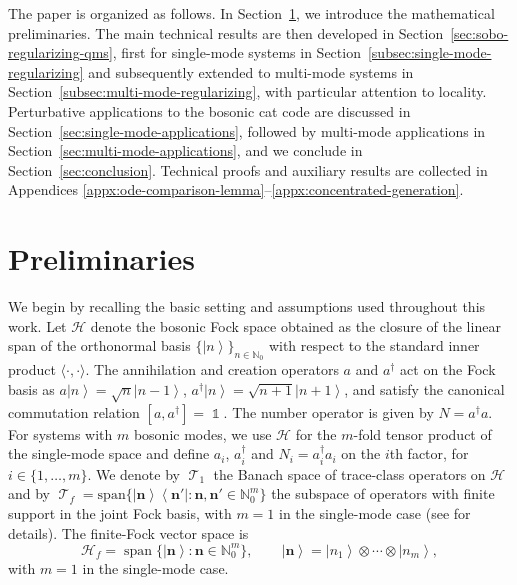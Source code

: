 \documentclass[11pt]{article}
\theoremstyle{myplain}
\theoremstyle{mydefinition}
\theoremstyle{remark}
\DeclareMathOperator{\cT}{\mathcal{T}}
\DeclareMathOperator{\1}{\mathds{1}}
\newcommand{\ketbra}[2]{\left\vert#1\right\rangle\!\! \left\langle#2\right\vert}
\newcommand{\ket}[1]{\left\vert #1 \right\rangle}
\begin{document}
    The paper is organized as follows. In Section~\ref{sec:prelim}, we introduce the mathematical preliminaries. The main technical results are then developed in Section~\ref{sec:sobo-regularizing-qms}, first for single-mode systems in Section~\ref{subsec:single-mode-regularizing} and subsequently extended to multi-mode systems in Section~\ref{subsec:multi-mode-regularizing}, with particular attention to locality. Perturbative applications to the bosonic cat code are discussed in Section~\ref{sec:single-mode-applications}, followed by multi-mode applications in Section~\ref{sec:multi-mode-applications}, and we conclude in Section~\ref{sec:conclusion}. Technical proofs and auxiliary results are collected in Appendices \ref{appx:ode-comparison-lemma}--\ref{appx:concentrated-generation}.
    


\section{Preliminaries}\label{sec:prelim}
    We begin by recalling the basic setting and assumptions used throughout this work. Let $\mathcal{H}$ denote the bosonic Fock space obtained as the closure of the linear span of the orthonormal basis $\{\ket{n}\}_{n \in \mathbb{N}_0}$ with respect to the standard inner product $\langle \cdot, \cdot \rangle$. The annihilation and creation operators $a$ and $a^\dagger$ act on the Fock basis as $a\ket{n} = \sqrt{n}\ket{n-1}$, $a^\dagger\ket{n} = \sqrt{n+1}\ket{n+1}$, and satisfy the canonical commutation relation $[a, a^\dagger] = \1$. The number operator is given by $N = a^\dagger a$. For systems with $m$ bosonic modes, we use $\mathcal{H}$ for the $m$-fold tensor product of the single-mode space and define $a_i$, $a_i^\dagger$ and $N_i = a_i^\dagger a_i$ on the $i$th factor, for $i \in \{1, \ldots, m\}$. We denote by $\cT_1$ the Banach space of trace-class operators on $\mathcal{H}$ and by $\cT_f = \mathrm{span}\{\ketbra{\boldsymbol n}{\boldsymbol n'} : \boldsymbol n, \boldsymbol n' \in \mathbb{N}_0^m\}$ the subspace of operators with finite support in the joint Fock basis, with $m=1$ in the single-mode case (see \cite{Holevo.2011,Bratteli.1981,Bratteli.1987} for details).
    The finite-Fock vector space is
    \begin{equation*}
        \mathcal H_f=\operatorname{span}\{\ket{\boldsymbol n}:\boldsymbol n\in\mathbb N_0^m\},\qquad \ket{\boldsymbol n}=\ket{n_1}\otimes\cdots\otimes\ket{n_m},
    \end{equation*}
    with $m=1$ in the single-mode case.
\end{document}
